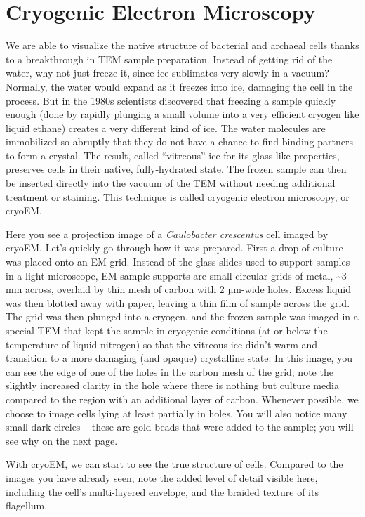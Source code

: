 \documentclass[]{tufte-book}
\begin{document}
\section{Cryogenic Electron
Microscopy}\label{cryogenic-electron-microscopy}

We are able to visualize the native structure of bacterial and archaeal
cells thanks to a breakthrough in TEM sample preparation. Instead of
getting rid of the water, why not just freeze it, since ice sublimates
very slowly in a vacuum? Normally, the water would expand as it freezes
into ice, damaging the cell in the process. But in the 1980s scientists
discovered that freezing a sample quickly enough (done by rapidly
plunging a small volume into a very efficient cryogen like liquid
ethane) creates a very different kind of ice. The water molecules are
immobilized so abruptly that they do not have a chance to find binding
partners to form a crystal. The result, called ``vitreous'' ice for its
glass-like properties, preserves cells in their native, fully-hydrated
state. The frozen sample can then be inserted directly into the vacuum
of the TEM without needing additional treatment or staining. This
technique is called cryogenic electron microscopy, or cryoEM.

Here you see a projection image of a \emph{Caulobacter crescentus} cell
imaged by cryoEM. Let's quickly go through how it was prepared. First a
drop of culture was placed onto an EM grid. Instead of the glass slides
used to support samples in a light microscope, EM sample supports are
small circular grids of metal, \textasciitilde{}3 mm across, overlaid by
thin mesh of carbon with 2 µm-wide holes. Excess liquid was then blotted
away with paper, leaving a thin film of sample across the grid. The grid
was then plunged into a cryogen, and the frozen sample was imaged in a
special TEM that kept the sample in cryogenic conditions (at or below
the temperature of liquid nitrogen) so that the vitreous ice didn't warm
and transition to a more damaging (and opaque) crystalline state. In
this image, you can see the edge of one of the holes in the carbon mesh
of the grid; note the slightly increased clarity in the hole where there
is nothing but culture media compared to the region with an additional
layer of carbon. Whenever possible, we choose to image cells lying at
least partially in holes. You will also notice many small dark circles
-- these are gold beads that were added to the sample; you will see why
on the next page.

With cryoEM, we can start to see the true structure of cells. Compared
to the images you have already seen, note the added level of detail
visible here, including the cell's multi-layered envelope, and the
braided texture of its flagellum.
\end{document}
